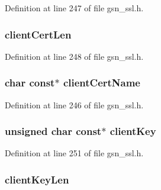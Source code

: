 Definition at line 247 of file gsn\_\-ssl.h.

\hypertarget{a00242_ac5992c4484c851247e76e7a2dc9af875}{
\subsubsection[{clientCertLen}]{ {\bf clientCertLen}}}
\label{a00242_ac5992c4484c851247e76e7a2dc9af875}


Definition at line 248 of file gsn\_\-ssl.h.

\hypertarget{a00242_add5887359d6c779b4e2a5b5e9d5faf83}{
\subsubsection[{clientCertName}]{\setlength{\rightskip}{0pt plus 5cm}char const$\ast$ {\bf clientCertName}}}
\label{a00242_add5887359d6c779b4e2a5b5e9d5faf83}


Definition at line 246 of file gsn\_\-ssl.h.

\hypertarget{a00242_af732e29f30802c9ef73516d35c0af353}{
\subsubsection[{clientKey}]{\setlength{\rightskip}{0pt plus 5cm}unsigned char const$\ast$ {\bf clientKey}}}
\label{a00242_af732e29f30802c9ef73516d35c0af353}


Definition at line 251 of file gsn\_\-ssl.h.

\hypertarget{a00242_a1da68c7fbd1e18b5ce1751b88d8926cc}{
\subsubsection[{clientKeyLen}]{ {\bf clientKeyLen}}}
\label{a00242_a1da68c7fbd1e18b5ce1751b88d8926cc}


